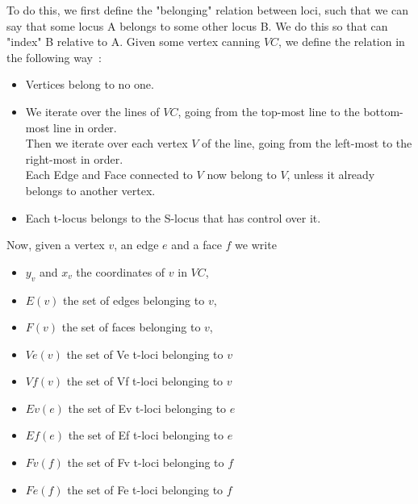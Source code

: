 \documentclass{article}
\begin{document}
To do this, we first define the "belonging" relation between loci, such that we can say that some locus A belongs to some other locus B. We do this so that can "index" B relative to A. Given some vertex canning $VC$, we define the relation in the following way~:
\begin{itemize}
	\item Vertices belong to no one.
	\item We iterate over the lines of $VC$, going from the top-most line to the bottom-most line in order.\\
	Then we iterate over each vertex $V$ of the line, going from the left-most to the right-most in order.\\
	Each Edge and Face connected to $V$ now belong to $V$, unless it already belongs to another vertex.
	\item Each t-locus belongs to the S-locus that has control over it.
\end{itemize}
Now, given a vertex $v$, an edge $e$ and a face $f$ we write
\begin{itemize}[noitemsep, nosep, label=-]
	\item $y_v$ and $x_v$ the coordinates of $v$ in $VC$,
	\item $E(v)$ the set of edges belonging to $v$,
	\item $F(v)$ the set of faces belonging to $v$,
	\item $Ve(v)$ the set of Ve t-loci belonging to $v$
	\item $Vf(v)$ the set of Vf t-loci belonging to $v$
	\item $Ev(e)$ the set of Ev t-loci belonging to $e$
	\item $Ef(e)$ the set of Ef t-loci belonging to $e$
	\item $Fv(f)$ the set of Fv t-loci belonging to $f$
	\item $Fe(f)$ the set of Fe t-loci belonging to $f$\\
\end{itemize}
\end{document}
